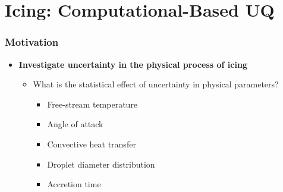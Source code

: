 \documentclass[9pt]{beamer}
\begin{document}
\section{Icing: Computational-Based UQ}
\label{sec-4}
\begin{frame}
\frametitle{Motivation}
\label{sec-4-1}

\begin{itemize}
\item \textbf{Investigate uncertainty in the physical process of icing}
\begin{itemize}
\item What is the statistical effect of uncertainty in physical parameters?
\begin{itemize}
\item Free-stream temperature
\item Angle of attack
\item Convective heat transfer
\item Droplet diameter distribution
\item Accretion time
\end{itemize}
\end{itemize}
\end{itemize}
\end{frame}
\end{document}
